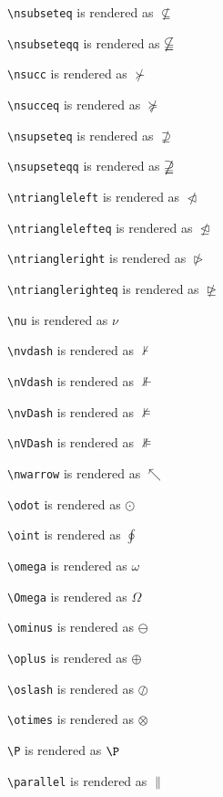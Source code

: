 \texttt{\textbackslash nsubseteq} is rendered as $\nsubseteq$


\texttt{\textbackslash nsubseteqq} is rendered as $\nsubseteqq$


\texttt{\textbackslash nsucc} is rendered as $\nsucc$


\texttt{\textbackslash nsucceq} is rendered as $\nsucceq$


\texttt{\textbackslash nsupseteq} is rendered as $\nsupseteq$


\texttt{\textbackslash nsupseteqq} is rendered as $\nsupseteqq$


\texttt{\textbackslash ntriangleleft} is rendered as $\ntriangleleft$


\texttt{\textbackslash ntrianglelefteq} is rendered as $\ntrianglelefteq$


\texttt{\textbackslash ntriangleright} is rendered as $\ntriangleright$


\texttt{\textbackslash ntrianglerighteq} is rendered as $\ntrianglerighteq$


\texttt{\textbackslash nu} is rendered as $\nu$


\texttt{\textbackslash nvdash} is rendered as $\nvdash$


\texttt{\textbackslash nVdash} is rendered as $\nVdash$


\texttt{\textbackslash nvDash} is rendered as $\nvDash$


\texttt{\textbackslash nVDash} is rendered as $\nVDash$


\texttt{\textbackslash nwarrow} is rendered as $\nwarrow$


\texttt{\textbackslash odot} is rendered as $\odot$


\texttt{\textbackslash oint} is rendered as $\oint$


\texttt{\textbackslash omega} is rendered as $\omega$


\texttt{\textbackslash Omega} is rendered as $\Omega$


\texttt{\textbackslash ominus} is rendered as $\ominus$


\texttt{\textbackslash oplus} is rendered as $\oplus$


\texttt{\textbackslash oslash} is rendered as $\oslash$


\texttt{\textbackslash otimes} is rendered as $\otimes$


\texttt{\textbackslash P} is rendered as $\P$


\texttt{\textbackslash parallel} is rendered as $\parallel$


